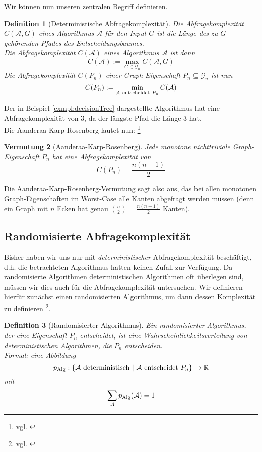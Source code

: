 \documentclass[10pt,a4paper]{scrreprt}
\newtheorem{definition}{Definition}
\newtheorem{conjecture}[definition]{Vermutung}
\theoremstyle{definition}
\begin{document}
Wir können nun unseren zentralen Begriff definieren.

\begin{definition}[Deterministische Abfragekomplexität]
Die \emph{Abfragekomplexität} $C(\mathcal{A},G)$ eines
Algorithmus $\mathcal{A}$ für den Input $G$ ist
die Länge des zu $G$ gehörenden Pfades des
Entscheidungsbaumes. \\
Die \emph{Abfragekomplexität} $C(\mathcal{A})$ eines
Algorithmus $\mathcal{A}$ ist dann
$$ C(\mathcal{A}) := \max_{G \in \mathcal{G}_n} C(\mathcal{A},G)$$
Die \emph{Abfragekomplexität} $C(P_n)$ einer Graph-Eigenschaft
$P_n\subseteq \mathcal{G}_n$ ist nun
$$ C(P_n) := \min_{\mathcal{A} \ {\rm entscheidet}\  P_n} C(\mathcal{A})$$
\end{definition}

Der in Beispiel \ref{exmpl:decisionTree} dargestellte
Algorithmus hat eine Abfragekomplexität von $3$, da
der längste Pfad die Länge $3$ hat. \\
Die Aanderaa-Karp-Rosenberg lautet nun:
\footnote{vgl. \cite[S.9]{Lovasz}}
\begin{conjecture}[Aanderaa-Karp-Rosenberg]
Jede monotone nichttriviale Graph-Eigenschaft $P_n$
hat eine Abfragekomplexität von
$$C(P_n) = \frac{n(n-1)}{2}$$
\end{conjecture}
Die Aanderaa-Karp-Rosenberg-Vermutung sagt also aus,
das bei allen monotonen Graph-Eigenschaften im Worst-Case
alle Kanten abgefragt werden müssen (denn ein Graph mit
$n$ Ecken hat genau ${\binom{n}{2}=\frac{n(n-1)}{2}}$ Kanten).

\subsection{Randomisierte Abfragekomplexität}

Bisher haben wir uns nur mit \emph{deterministischer}
Abfragekomplexität beschäftigt, d.h. die betrachteten
Algorithmus hatten keinen Zufall zur Verfügung.
Da randomisierte Algorithmen deterministischen Algorithmen
oft überlegen sind, müssen wir dies auch für
die Abfragekomplexität untersuchen.
Wir definieren hierfür zunächst einen randomisierten
Algorithmus, um dann dessen Komplexität zu definieren
\footnote{vgl. \cite[S.120]{Groeger}}.
\begin{definition}[Randomisierter Algorithmus]
Ein \emph{randomisierter Algorithmus}, der eine
Eigenschaft $P_n$ entscheidet, ist eine
Wahrscheinlichkeitsverteilung von deterministischen
Algorithmen, die $P_n$ entscheiden. \\
Formal: eine Abbildung
$$ p_\textup{Alg}: \{ \mathcal{A} \ \textup {deterministisch} \ | \
         \mathcal{A} \ {\rm entscheidet} \ P_n \} \to \mathbb{R} $$
mit 
$$\sum_\mathcal{A} p_\textup{Alg}(\mathcal{A}) = 1$$
\end{definition}
\end{document}
